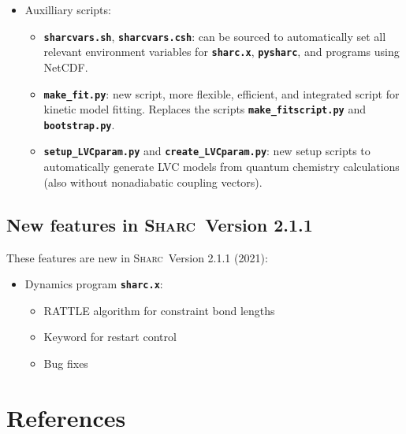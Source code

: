\documentclass[a4paper,10pt,DIV=15,openany]{scrbook}
\newcommand{\sharc}{\textsc{Sharc}}
\newcommand{\ttt}[1]{\textbf{\texttt{#1}}}
\begin{document}
\begin{itemize}
\begin{itemize}
  \end{itemize}
  \item Auxilliary scripts:
  \begin{itemize}
    \item \ttt{sharcvars.sh}, \ttt{sharcvars.csh}: can be sourced to automatically set all relevant environment variables for \ttt{sharc.x}, \ttt{pysharc}, and programs using NetCDF.
    \item \ttt{make\_fit.py}: new script, more flexible, efficient, and integrated script for kinetic model fitting. Replaces the scripts \ttt{make\_fitscript.py} and \ttt{bootstrap.py}.
    \item \ttt{setup\_LVCparam.py} and \ttt{create\_LVCparam.py}: new setup scripts to automatically generate LVC models from quantum chemistry calculations (also without nonadiabatic coupling vectors).
  \end{itemize}
\end{itemize}


\subsection{New features in \sharc\ Version 2.1.1}

These features are new in \sharc\ Version 2.1.1 (2021):
\begin{itemize}
  \item Dynamics program \ttt{sharc.x}:
  \begin{itemize}
    \item RATTLE algorithm for constraint bond lengths
    \item Keyword for restart control
    \item Bug fixes
  \end{itemize}
\end{itemize}




\section{References}
\end{document}
